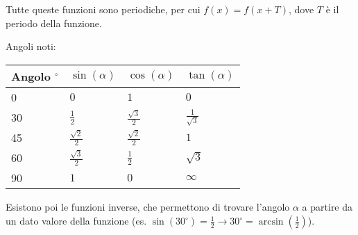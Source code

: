 Tutte queste funzioni sono periodiche, per cui $f(x) = f(x+T)$, dove $T$ è il periodo della funzione.

Angoli noti:

\begin{table}[H]
    \centering
    \begin{tabular}{|l|l|l|l|}
        \hline
        Angolo $^{\circ}$ & $\sin(\alpha)$        & $\cos(\alpha)$        & $\tan(\alpha)$       \\ \hline
        0                 & $0$                   & $1$                   & $0$                  \\ \hline
        30                & $\frac{1}{2}$         & $\frac{\sqrt{3}}{2}$  & $\frac{1}{\sqrt{3}}$ \\ \hline
        45                & $\frac{\sqrt{2}}{2} $ & $\frac{\sqrt{2}}{2} $ & $1$                  \\ \hline
        60                & $\frac{\sqrt{3}}{2}$  & $\frac{1}{2}$         & $\sqrt{3}$           \\ \hline
        90                & $1$                   & $0$                   & $\infty$             \\ \hline
    \end{tabular}
\end{table}

Esistono poi le funzioni inverse, che permettono di trovare l'angolo $\alpha$ a partire da un dato valore della funzione (es. $\sin(30^{\circ}) = \frac{1}{2} \rightarrow 30^{\circ} = \arcsin(\frac{1}{2})$).

\begin{figure}[H]
    \centering
\end{figure}

